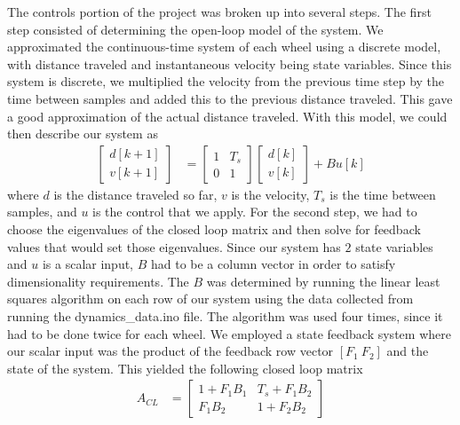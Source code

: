 \documentclass[12pt]{article}
\begin{document}
The controls portion of the project was broken up into several steps. The first
step consisted of determining the open-loop model of the system. We
approximated the continuous-time system of each wheel using a discrete model,
with distance traveled and instantaneous velocity being state variables. Since
this system is discrete, we multiplied the velocity from the previous time step
by the time between samples and added this to the previous distance traveled.
This gave a good approximation of the actual distance traveled. With this
model, we could then describe our system as
\begin{align*}
  \begin{bmatrix}
    d[k+1] \\
    v[k+1]
  \end{bmatrix} &=
  \begin{bmatrix}
    1 & T_s \\
    0 & 1
  \end{bmatrix}
  \begin{bmatrix}
    d[k] \\
    v[k]
  \end{bmatrix} + B u[k]
\end{align*}
where $d$ is the distance
traveled so far, $v$ is the velocity, $T_s$ is the time between samples, and
$u$ is the control that we apply. For the second step, we had to choose the
eigenvalues of the closed loop matrix and then solve for feedback values that
would set those eigenvalues. Since our system has $2$ state variables and $u$
is a scalar input, $B$ had to be a column vector in order to satisfy
dimensionality requirements. The $B$ was determined by running the linear least
squares algorithm on each row of our system using the data collected from
running the dynamics\_data.ino file. The algorithm was used four times, since
it had to be done twice for each wheel. We employed a state feedback system
where our scalar input was the product of the feedback row vector $[F_1 \ F_2]$
and the state of the system. This yielded the following closed loop matrix
\begin{align*}
  A_{CL} &= \begin{bmatrix}
            1 + F_1 B_1 & T_s + F_1 B_2 \\
            F_1 B_2 & 1 + F_2 B_2
          \end{bmatrix}
\end{align*}
\end{document}
